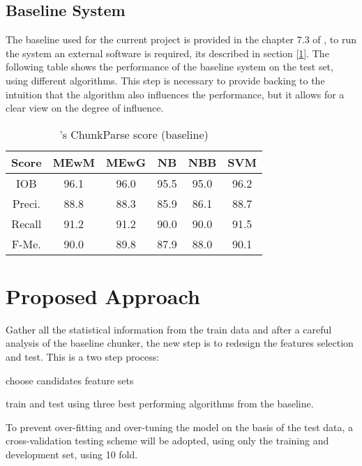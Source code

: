 \documentclass[11pt]{article}
\begin{document}
\subsection{Baseline System}\label{baseline}

The baseline used for the current project is provided in the chapter 7.3 of \cite{Nltk:09}, to run the system an external software is required, its described in section [\ref{approach}]. The following table shows the performance of the baseline system on the test set, using different algorithms. This step is necessary to provide backing to the intuition that the algorithm also influences the performance, but it allows for a clear view on the degree of influence.

\begin{table}
	
		\begin{tabular}{|c|c|c|c|c|c|}
			\hline 
			 Score & MEwM & MEwG& NB& NBB & SVM   \\
			\hline 
			IOB  & 96.1 &96.0 &95.5 & 95.0 & 96.2 \\  
			\hline 
			Preci.   &  88.8 &88.3 & 85.9&86.1 & 88.7\\ 
			\hline 
			Recall      &  91.2 & 91.2& 90.0&90.0 & 91.5\\ 
			\hline 
			F-Me.   &  90.0 & 89.8&87.9 &88.0 & 90.1 \\ 
	
			\hline	
		\end{tabular}
		\caption {\cite{Nltk:09}'s ChunkParse score (baseline)}

\end{table}






\section{Proposed Approach}\label{approach}
Gather all the statistical information from the train data and after a careful analysis of the baseline chunker, the new step is to redesign the features selection and test.
This is a two step process:
\begin{list}{label}{spacing}
	\item choose candidates feature sets
	\item train and test using three best performing algorithms from the baseline.
\end{list}
To prevent over-fitting and over-tuning the model on the basis of the test data, a cross-validation testing scheme will be adopted, using only the training and development set, using 10 fold.
\end{document}
